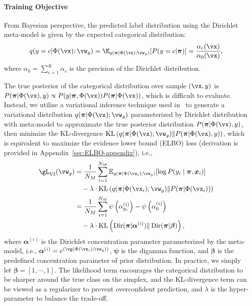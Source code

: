 \paragraph{Training Objective}\label{subsec: objective}
From Bayesian perspective, the predicted label distribution using the Dirichlet meta-model is given by the expected categorical distribution: 
\begin{equation}
q(y=c|\Phi(\vx); \vw_g) = \E_{q(\boldsymbol{\pi}|\Phi(\vx); \vw_g)} [P(y=c|\boldsymbol{\pi})] = \frac{\alpha_c(\vx)}{\alpha_0(\vx)},
\end{equation}
where $\alpha_0=\sum_{c=1}^K \alpha_c$ is the precision of the Dirichlet distribution.

The true posterior of the categorical distribution over sample $(\vx,y)$ is $P(\boldsymbol{\pi}| \Phi(\vx), y) \propto P(y | \boldsymbol{\pi}, \Phi(\vx)) P(\boldsymbol{\pi} | \Phi(\vx))$, which is difficult to evaluate. Instead, we utilize a variational inference technique used in~\citep{joo2020being} to generate a variational distribution $q(\boldsymbol{\pi}| \Phi(\vx); \vw_g)$ parameterized by Dirichlet distribution with meta-model to approximate the true posterior distribution $P(\boldsymbol{\pi}| \Phi(\vx), y)$, then minimize the KL-divergence $\mathrm{KL}\left(q(\boldsymbol{\pi}| \Phi(\vx); \vw_g) \| P(\boldsymbol{\pi}| \Phi(\vx), y)\right)$, which is equivalent to maximize the evidence lower bound (ELBO) loss (derivation is provided in Appendix~\ref{sec:ELBO-appendix}), i.e.,
\begin{align}
\gL_{\mathrm{VI}}(\vw_g) &=\frac{1}{N_M}\sum_{i=1}^{N_M} \mathbb{E}_{q(\boldsymbol{\pi}| \Phi(\vx_i); \vw_g)}[\log P(y_i \mid \boldsymbol{\pi}, \boldsymbol{x}_i)] \nonumber \\
&\quad - \lambda\cdot\mathrm{KL}\left(q(\boldsymbol{\pi}| \Phi(\vx_i); \vw_g) \| P(\boldsymbol{\pi} | \Phi(\vx_i))\right)\\
&= \frac{1}{N_M}\sum_{i=1}^{N_M} \psi\left(\alpha^{(i)}_{y_i}\right)-\psi\left(\alpha^{(i)}_{0}\right)  \nonumber\\
&\quad - \lambda\cdot \mathrm{KL}\left( \operatorname{Dir}(\boldsymbol{\pi}| \boldsymbol{\alpha}^{(i)}) \| \operatorname{Dir}(\boldsymbol{\pi} | \boldsymbol{\beta})\right),
\end{align}
where $\boldsymbol{\alpha}^{(i)}$ is the Dirichlet concentration parameter parameterized by the meta-model, i.e., $\boldsymbol{\alpha}^{(i)} = e^{\left(\vg\left(\Phi(\vx_i); \vw_g\right)\right)}$, $\boldsymbol{\psi}$ is the digamma function, and $\boldsymbol{\beta}$ is the predefined concentration parameter of prior distribution. In practice, we simply let $\boldsymbol{\beta} = [1,\cdots,1]$. The likelihood term encourages the categorical distribution to be sharper around the true class on the simplex, and the KL-divergence term can be viewed as a regularizer to prevent overconfident prediction, and $\lambda$ is the hyper-parameter to balance the trade-off.


